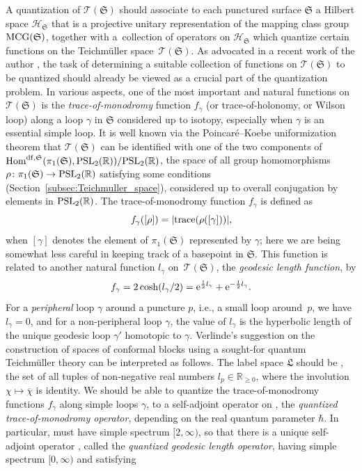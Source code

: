 \documentclass[10pt,a4paper]{amsart}
\numberwithin{equation}{section}
\theoremstyle{definition}
\newcommand{\ol}[1]{\overline{#1}}
\begin{document}
A quantization of $\mathscr{T}(\mathfrak{S})$ should associate to each punctured surface $\mathfrak{S}$ a Hilbert space $\mathscr{H}_\mathfrak{S}$ that is a projective unitary representation of the mapping class group ${\rm MCG}(\mathfrak{S})$, together with a~collection of operators on $\mathscr{H}_\mathfrak{S}$ which quantize certain functions on the Teichm\"uller space~$\mathscr{T}(\mathfrak{S})$. As advocated in a recent work of the author \cite{KS}, the task of determining a suitable collection of functions on $\mathscr{T}(\mathfrak{S})$ to be quantized should already be viewed as a crucial part of the quantization problem. In various aspects, one of the most important and natural functions on $\mathscr{T}(\mathfrak{S})$ is the {\em trace-of-monodromy} function $f_\gamma$ (or trace-of-holonomy, or Wilson loop) along a loop $\gamma$ in $\mathfrak{S}$ considered up to isotopy, especially when $\gamma$ is an essential simple loop. It is well known via the Poincar\'e--Koebe uniformization theorem that $\mathscr{T}(\mathfrak{S})$ can be identified with one of the two components of ${\rm Hom}^{{\rm df},\mathfrak{S}}(\pi_1(\mathfrak{S}), {\rm PSL}_2(\mathbb{R}))/{\rm PSL}_2(\mathbb{R})$, the space of all group homomorphisms $\rho\colon \pi_1(\mathfrak{S}) \to {\rm PSL}_2(\mathbb{R})$ satisfying some conditions (Section~\ref{subsec:Teichmuller_space}), considered up to overall conjugation by elements in ${\rm PSL}_2(\mathbb{R})$. The trace-of-monodromy function $f_\gamma$ is defined as
\[
f_\gamma([\rho]) = |{\rm trace}(\rho([\gamma]))|,
\]
when $[\gamma]$ denotes the element of $\pi_1(\mathfrak{S})$ represented by $\gamma$; here we are being somewhat less careful in keeping track of a basepoint in $\mathfrak{S}$. This function is related to another natural function $l_\gamma$ on~$\mathscr{T}(\mathfrak{S})$, the {\em geodesic length function}, by
\[
f_\gamma = 2\cosh(l_\gamma/2) = {\rm e}^{\frac{1}{2} l_\gamma} + {\rm e}^{-\frac{1}{2} l_\gamma}.
\]
For a {\em peripheral} loop $\gamma$ around a puncture $p$, i.e., a small loop around~$p$, we have $l_\gamma=0$, and for a non-peripheral loop $\gamma$, the value of $l_\gamma$ is the hyperbolic length of the unique geodesic loop $\gamma'$ homotopic to $\gamma$.
Verlinde's suggestion on the construction of spaces of conformal blocks using a sought-for quantum Teichm\"uller theory can be interpreted as follows. The label space $\mathfrak{L}$ should be , the set of all tuples  of non-negative real numbers $l_p \in \mathbb{R}_{\ge 0}$, where the involution $\chi \mapsto \ol{\chi}$ is identity. We should be able to quantize the trace-of-monodromy functions $f_\gamma$ along simple loops $\gamma$, to a self-adjoint operator  on , the {\em quantized trace-of-monodromy operator}, depending on the real quantum parameter $\hbar$. In particular,  must have simple spectrum $[2,\infty)$, so that there is a unique self-adjoint operator , called the {\em quantized geodesic length operator}, having simple spectrum $[0,\infty)$ and satisfying
\end{document}
